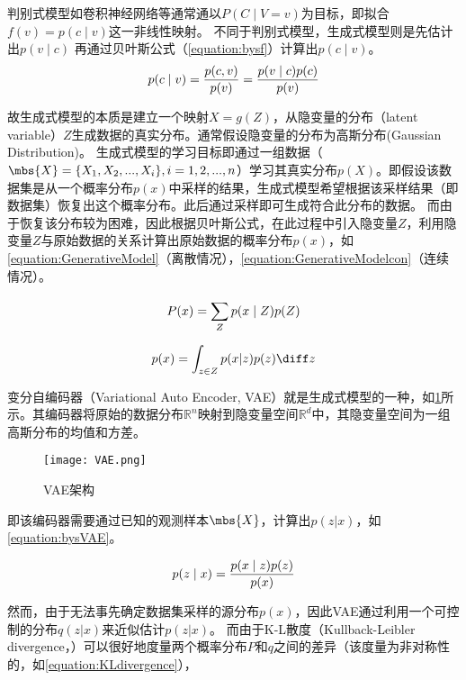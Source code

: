 判别式模型如卷积神经网络等通常通以$P(C \mid V=v)$为目标，即拟合$f(v) = p(c \mid v)$这一非线性映射。
不同于判别式模型，生成式模型则是先估计出$p(v \mid c)$ 再通过贝叶斯公式（\cref{equation:bysf}）计算出$p(c \mid v)$。
\begin{equation}
  \centering
  \label{equation:bysf}
  p(c \mid v) = \frac{p(c, v)}{p(v)} = \frac{p(v \mid c)p(c)}{p(v)} 
\end{equation}

故生成式模型的本质是建立一个映射$X=g(Z)$，从隐变量的分布（latent variable）$Z$生成数据的真实分布。通常假设隐变量的分布为高斯分布(Gaussian Distribution)。
生成式模型的学习目标即通过一组数据（$\mbs{X} = \{X_1, X_2, ..., X_i\}, i = 1, 2, ..., n$）学习其真实分布$p(X)$。即假设该数据集是从一个概率分布$p(x)$中采样的结果，生成式模型希望根据该采样结果（即数据集）恢复出这个概率分布。此后通过采样即可生成符合此分布的数据。
而由于恢复该分布较为困难，因此根据贝叶斯公式，在此过程中引入隐变量$Z$，利用隐变量$Z$与原始数据的关系计算出原始数据的概率分布$p(x)$，如\cref{equation:GenerativeModel}（离散情况），\cref{equation:GenerativeModelcon}（连续情况）。

\begin{equation}
  \centering
  \label{equation:GenerativeModel}
  P(x) = \sum_{Z}^{}p(x\mid Z)p(Z)
\end{equation}

\begin{equation}
  \centering
  \label{equation:GenerativeModelcon}
  p(x) = \int_{z \in Z}^{} p(x|z)p(z)\diff z
\end{equation}

变分自编码器（Variational Auto Encoder, VAE）就是生成式模型的一种，如\cref{figure:VAE}所示。其编码器将原始的数据分布$\mathbb{R}^n$映射到隐变量空间$\mathbb{R}^d$中，其隐变量空间为一组高斯分布的均值和方差。
\begin{figure}[h]
  \centering
  \texttt{[image: VAE.png]}
  \caption{VAE架构}
  \label{figure:VAE}
  \end{figure}

即该编码器需要通过已知的观测样本$\mbs{X}$，计算出$p(z|x)$，如\cref{equation:bysVAE}。

\begin{equation}
  \centering
  \label{equation:bysVAE}
  p(z \mid x) = \frac{p(x \mid z)p(z)}{p(x)} 
\end{equation}

然而，由于无法事先确定数据集采样的源分布$p(x)$，因此VAE通过利用一个可控制的分布$q(z|x)$来近似估计$p(z|x)$。
而由于K-L散度（Kullback-Leibler divergence，）可以很好地度量两个概率分布$P$和$q$之间的差异（该度量为非对称性的，如\cref{equation:KLdivergence}），

